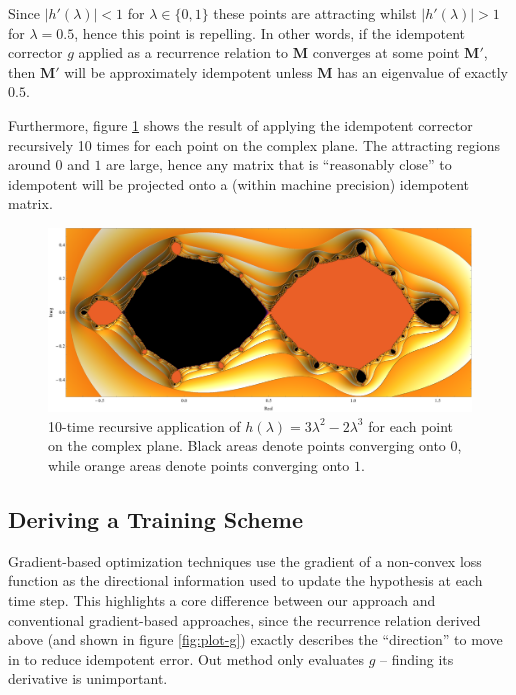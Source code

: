 \documentclass{article}
\newcommand{\vM}{\mathbf{M}}
\begin{document}
Since $|h'(\lambda)| < 1$ for $\lambda \in \{0, 1\}$ these points are attracting whilst $|h'(\lambda)| > 1$ for $\lambda = 0.5$, hence this point is repelling. In other words, if the idempotent corrector $g$ applied as a recurrence relation to $\vM$ converges at some point $\vM'$, then $\vM'$ will be approximately idempotent unless $\vM$ has an eigenvalue of exactly $0.5$.

Furthermore, figure \ref{fig:fractal} shows the result of applying the idempotent corrector recursively 10 times for each point on the complex plane. The attracting regions around $0$ and $1$ are large, hence any matrix that is ``reasonably close'' to idempotent will be projected onto a (within machine precision) idempotent matrix.

\begin{figure}[H]
  \centering
  \includegraphics[width=\textwidth]{./resources/fractal.pdf}
  \caption{10-time recursive application of $h(\lambda) = 3\lambda^2 - 2\lambda^3$ for each point on the complex plane. Black areas denote points converging onto $0$, while orange areas denote points converging onto $1$.}
  \label{fig:fractal}
\end{figure}


\subsection{Deriving a Training Scheme}
Gradient-based optimization techniques use the gradient of a non-convex loss function as the directional information used to update the hypothesis at each time step. This highlights a core difference between our approach and conventional gradient-based approaches, since the recurrence relation derived above (and shown in figure \ref{fig:plot-g}) exactly describes the ``direction'' to move in to reduce idempotent error. Out method only evaluates $g$ -- finding its derivative is unimportant.
\end{document}
